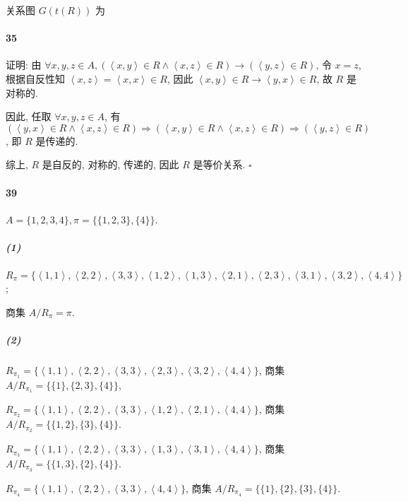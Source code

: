 \documentclass{ctexart}
\def\QED{\hfill $\square$}
\def\pair#1{\left\langle #1 \right\rangle}
\def\conj{\mathrel{\wedge}}
\begin{document}
关系图 $G(t(R))$ 为

\begin{center}
\end{center}

\paragraph*{35} 证明: 由 $\forall x,y,z\in A, (\pair{x,y}\in R \conj \pair{x,z}\in R)\to (\pair{y,z}\in R)$,
令 $x=z$, 根据自反性知 $\pair{x,z}=\pair{x,x}\in R$, 因此 $\pair{x,y}\in R \to \pair{y,x}\in R$,
故 $R$ 是对称的.

因此, 任取 $\forall x,y,z\in A$,
有$(\pair{y,x}\in R \conj \pair{x,z}\in R)\Rightarrow (\pair{x,y}\in R \conj \pair{x,z}\in R) \Rightarrow (\pair{y,z}\in R)$,
即 $R$ 是传递的.

综上, $R$ 是自反的, 对称的, 传递的, 因此 $R$ 是等价关系. \QED

\paragraph*{39} $A=\{1,2,3,4\}, \pi=\{\{1,2,3\}, \{4\}\}$.

\subparagraph*{(1)} $R_\pi = \{\pair{1,1}, \pair{2,2}, \pair{3,3}, \pair{1, 2}, \pair{1, 3}, \pair{2, 1}, \pair{2, 3}, \pair{3, 1}, \pair{3, 2}, \pair{4,4}\}$;

商集 $A/R_\pi = \pi$.

\subparagraph*{(2)} $R_{\pi_1} = \{\pair{1,1}, \pair{2,2}, \pair{3,3}, \pair{2, 3}, \pair{3, 2}, \pair{4,4}\}$,
商集 $A/R_{\pi_1} = \{\{1\}, \{2,3\}, \{4\}\}$,

$R_{\pi_2} = \{\pair{1,1}, \pair{2,2}, \pair{3,3}, \pair{1, 2}, \pair{2, 1}, \pair{4,4}\}$,
商集 $A/R_{\pi_2} = \{\{1,2\}, \{3\}, \{4\}\}$.

$R_{\pi_3} = \{\pair{1,1}, \pair{2,2}, \pair{3,3}, \pair{1, 3}, \pair{3, 1}, \pair{4,4}\}$,
商集 $A/R_{\pi_3} = \{\{1,3\}, \{2\}, \{4\}\}$.

$R_{\pi_4} = \{\pair{1,1}, \pair{2,2}, \pair{3,3}, \pair{4,4}\}$,
商集 $A/R_{\pi_4} = \{\{1\}, \{2\}, \{3\}, \{4\}\}$.
\end{document}
